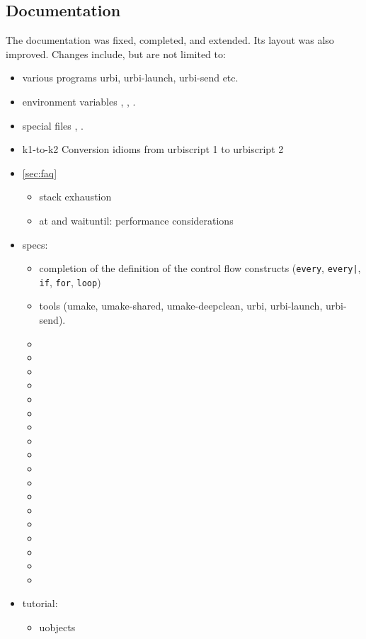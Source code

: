 \subsection{Documentation}

The documentation was fixed, completed, and extended.  Its layout was
also improved.  Changes include, but are not limited to:

\begin{itemize}
\item various programs
  urbi, urbi-launch, urbi-send etc.
\item environment variables
  , , .
\item special files
  , .
\item k1-to-k2
  Conversion idioms from urbiscript 1 to urbiscript 2
\item \autoref{sec:faq}
  \begin{itemize}
  \item stack exhaustion
  \item at and waituntil: performance considerations
  \end{itemize}
\item specs:
  \begin{itemize}
  \item completion of the definition of the control flow constructs
    (\lstinline|every|, \lstinline{every|}, \lstinline|if|,
    \lstinline|for|, \lstinline|loop|)
  \item tools (umake, umake-shared, umake-deepclean, urbi,
    urbi-launch, urbi-send).
  \item {}
  \item {}
  \item {}
  \item {}
  \item {}
  \item {}
  \item {}
  \item {}
  \item {}
  \item {}
  \item {}
  \item {}
  \item {}
  \item {}
  \item {}
  \item {}
  \item {}
  \item {}
  \end{itemize}
\item tutorial:
  \begin{itemize}
  \item uobjects
  \end{itemize}
\end{itemize}

